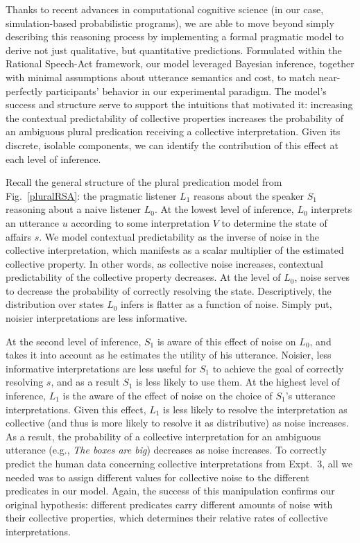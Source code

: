 \documentclass[linguex]{sp}
\begin{document}
Thanks to recent advances in computational cognitive science (in our case, simulation-based probabilistic programs), we are able to move beyond simply describing this reasoning process by implementing a formal pragmatic model to derive not just qualitative, but quantitative predictions. Formulated within the Rational Speech-Act framework, our model leveraged Bayesian inference, together with minimal assumptions about utterance semantics and cost, to match near-perfectly participants' behavior in our experimental paradigm. The model's success and structure serve to support the intuitions that motivated it: increasing the contextual predictability of collective properties increases the probability of an ambiguous plural predication receiving a collective interpretation. Given its discrete, isolable components, we can identify the contribution of this effect at each level of inference. 

Recall the general structure of the plural predication model from Fig.~\ref{pluralRSA}: the pragmatic listener $L_{1}$ reasons about the speaker $S_{1}$ reasoning about a naive listener $L_{0}$. At the lowest level of inference, $L_{0}$ interprets an utterance $u$ according to some interpretation $V$ to determine the state of affairs $s$. We model contextual predictability as the inverse of noise in the collective interpretation, which manifests as a scalar multiplier of the estimated collective property. In other words, as collective noise increases, contextual predictability of the collective property decreases. At the level of $L_{0}$, noise serves to decrease the probability of correctly resolving the state. Descriptively, the distribution over states $L_{0}$ infers is flatter as a function of noise. Simply put, noisier interpretations are less informative.

At the second level of inference, $S_{1}$ is aware of this effect of noise on $L_{0}$, and takes it into account as he estimates the utility of his utterance. Noisier, less informative interpretations are less useful for $S_{1}$ to achieve the goal of correctly resolving $s$, and as a result $S_{1}$ is less likely to use them. At the highest level of inference, $L_{1}$ is the aware of the effect of noise on the choice of $S_{1}$'s utterance interpretations. Given this effect, $L_{1}$ is less likely to resolve the interpretation as collective (and thus is more likely to resolve it as distributive) as noise increases. As a result, the probability of a collective interpretation for an ambiguous utterance (e.g., \emph{The boxes are big}) decreases as noise increases. To correctly predict the human data concerning collective interpretations from Expt.~3, all we needed was to assign different values for collective noise to the different predicates in our model. Again, the success of this manipulation confirms our original hypothesis: different predicates carry different amounts of noise with their collective properties, which determines their relative rates of collective interpretations.
\end{document}
